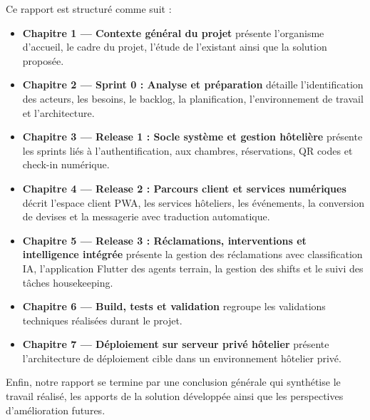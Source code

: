 Ce rapport est structuré comme suit :
\begin{itemize}
    \item \textbf{Chapitre 1 --- Contexte général du projet} présente l'organisme d'accueil, le cadre du projet, l'étude de l'existant ainsi que la solution proposée.
    \item \textbf{Chapitre 2 --- Sprint 0 : Analyse et préparation} détaille l'identification des acteurs, les besoins, le backlog, la planification, l'environnement de travail et l'architecture.
    \item \textbf{Chapitre 3 --- Release 1 : Socle système et gestion hôtelière} présente les sprints liés à l'authentification, aux chambres, réservations, QR codes et check-in numérique.
    \item \textbf{Chapitre 4 --- Release 2 : Parcours client et services numériques} décrit l'espace client PWA, les services hôteliers, les événements, la conversion de devises et la messagerie avec traduction automatique.
    \item \textbf{Chapitre 5 --- Release 3 : Réclamations, interventions et intelligence intégrée} présente la gestion des réclamations avec classification IA, l'application Flutter des agents terrain, la gestion des shifts et le suivi des tâches housekeeping.
    \item \textbf{Chapitre 6 --- Build, tests et validation} regroupe les validations techniques réalisées durant le projet.
    \item \textbf{Chapitre 7 --- Déploiement sur serveur privé hôtelier} présente l'architecture de déploiement cible dans un environnement hôtelier privé.
\end{itemize}

Enfin, notre rapport se termine par une conclusion générale qui synthétise le travail réalisé, les apports de la solution développée ainsi que les perspectives d'amélioration futures.
